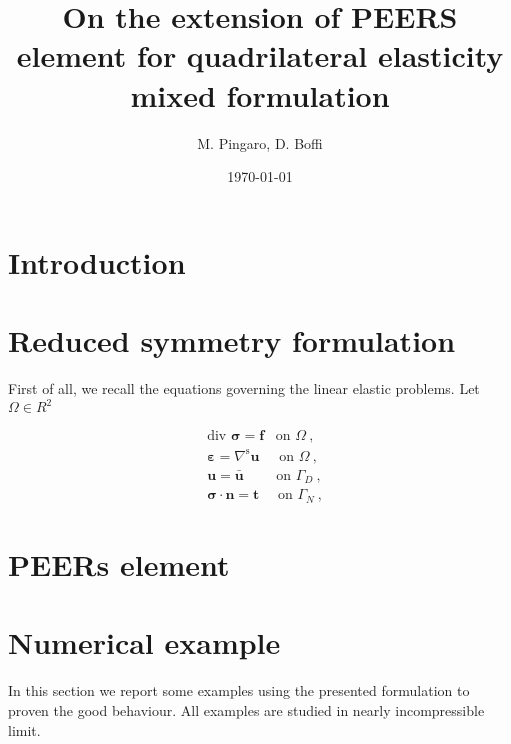 \documentclass[a4paper,11pt]{article}
\title{\textbf{On the extension of PEERS element for quadrilateral elasticity mixed formulation}}
\date{\today}
\author{M. Pingaro, D. Boffi}
\newcommand{\bu}{\bm{u}}
\newcommand{\bsigma}{\bm{\sigma}}
\newcommand{\strain}{\bm{\varepsilon}}
\newcommand{\symm}{^\text{s}}
\newcommand{\grads}{\nabla\symm}
\newcommand{\divsig}{\mbox{div }\bsigma}
\begin{document}
\maketitle

\section{Introduction}

\section{Reduced symmetry formulation}
First of all, we recall the equations governing the linear elastic problems.
Let $\Omega \in R^{2}$ 

\begin{equation} \label{eq:equilibium_congruence}
\begin{split}
&\divsig = \bm{f} \hspace{10pt} \mbox{on } \Omega\:, \\
&\strain = \grads\bu \hspace{17pt} \mbox{on } \Omega\:, \\
&\bu = \bar{\bu} \hspace{28pt} \mbox{on } \Gamma_{D}\:, \\
&\bsigma\cdot \bm{n} = \bm{t} \hspace{16pt} \mbox{on } \Gamma_{N}\:,
\end{split}
\end{equation}

 
\section{PEERs element}

\section{Numerical example}
In this section we report some examples using the presented formulation to proven the good behaviour. All examples are studied in nearly incompressible limit. 
\end{document}
